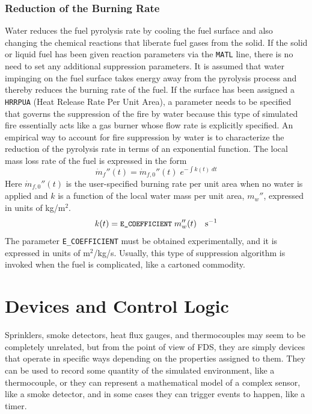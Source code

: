 \documentclass[11pt]{book}
\newcommand{\ct}{\tt\small}
\newcommand{\dm}{\dot{m}}
\newcommand{\be}{\begin{equation}}
\newcommand{\ee}{\end{equation}}
\begin{document}
\subsection{Reduction of the Burning Rate}

Water reduces the fuel pyrolysis rate by cooling the fuel surface and also
changing the chemical reactions that liberate fuel gases from the solid.
If the solid or liquid fuel has been given reaction parameters via the {\ct MATL} line, there is no
need to set any additional suppression parameters. It is assumed that
water impinging on the fuel surface takes energy away from the
pyrolysis process and thereby reduces the burning rate of the fuel.
If the surface has been assigned a {\ct HRRPUA} (Heat Release Rate Per Unit Area),
a parameter needs to be specified that governs the suppression of the fire by water because this type of simulated
fire essentially acts like a gas burner whose flow rate is explicitly specified.
An empirical way to account for fire suppression by water
is to characterize the reduction of the pyrolysis rate in terms
of an exponential function. The local mass loss rate of the
fuel is expressed in the form
\be \dm_f''(t) = \dm_{f,0}''(t) \; e^{-\int k(t) \; dt} \label{nistexting} \ee
Here $\dm_{f,0}''(t)$ is the user-specified burning rate per unit
area when no water is applied and $k$ is a function of the local water
mass per unit area, $m_w''$, expressed in units of kg/m$^2$.
\be
k(t) = \hbox{\ct E\_COEFFICIENT} \; m_w''(t) \quad          \hbox{s}^{-1}
\ee
The parameter {\ct E\_COEFFICIENT} must be obtained experimentally, and
it is expressed in units of m$^2$/kg/s. Usually, this type of suppression
algorithm is invoked when the fuel is complicated, like a cartoned commodity.






\chapter{Devices and Control Logic}

Sprinklers, smoke detectors, heat flux gauges, and thermocouples
may seem to be completely unrelated, but from the point of view
of FDS, they are simply devices that operate in specific ways depending
on the properties assigned to them. They can be used to record some
quantity of the simulated environment, like a thermocouple, or they can represent a mathematical model
of a complex sensor, like a smoke detector,
and in some cases they can trigger events to happen, like a timer.
\end{document}

